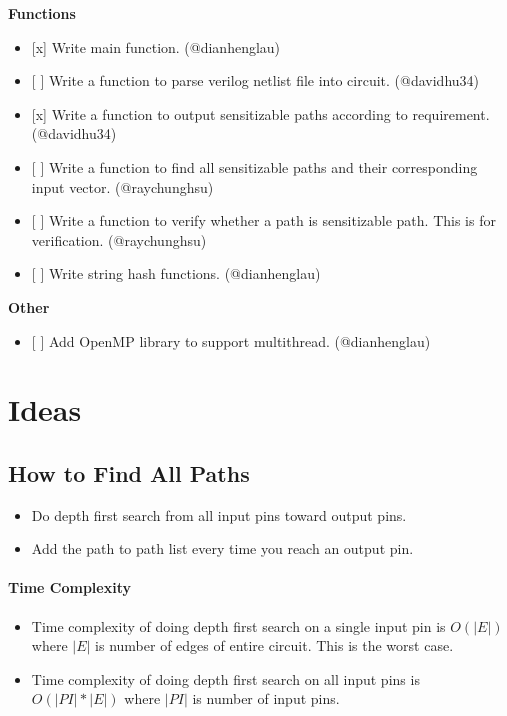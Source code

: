 \documentclass[]{article}
\providecommand{\tightlist}{%
  \setlength{\itemsep}{0pt}\setlength{\parskip}{0pt}}
\let\oldparagraph\paragraph
\renewcommand{\paragraph}[1]{\oldparagraph{#1}\mbox{}}
\begin{document}
\textbf{Functions}

\begin{itemize}
\tightlist
\item
  {[}x{]} Write main function. (@dianhenglau)
\item
  {[} {]} Write a function to parse verilog netlist file into circuit.
  (@davidhu34)
\item
  {[}x{]} Write a function to output sensitizable paths according to
  requirement. (@davidhu34)
\item
  {[} {]} Write a function to find all sensitizable paths and their
  corresponding input vector. (@raychunghsu)
\item
  {[} {]} Write a function to verify whether a path is sensitizable
  path. This is for verification. (@raychunghsu)
\item
  {[} {]} Write string hash functions. (@dianhenglau)
\end{itemize}

\textbf{Other}

\begin{itemize}
\tightlist
\item
  {[} {]} Add OpenMP library to support multithread. (@dianhenglau)
\end{itemize}

\section{Ideas}\label{ideas}

\subsection{How to Find All Paths}\label{how-to-find-all-paths}

\begin{itemize}
\item
  Do depth first search from all input pins toward output pins.
\item
  Add the path to path list every time you reach an output pin.
\end{itemize}

\paragraph{Time Complexity}\label{time-complexity}

\begin{itemize}
\item
  Time complexity of doing depth first search on a single input pin is
  \(O(|E|)\) where \(|E|\) is number of edges of entire circuit. This is
  the worst case.
\item
  Time complexity of doing depth first search on all input pins is
  \(O(|PI| * |E|)\) where \(|PI|\) is number of input pins.
\end{itemize}
\end{document}
